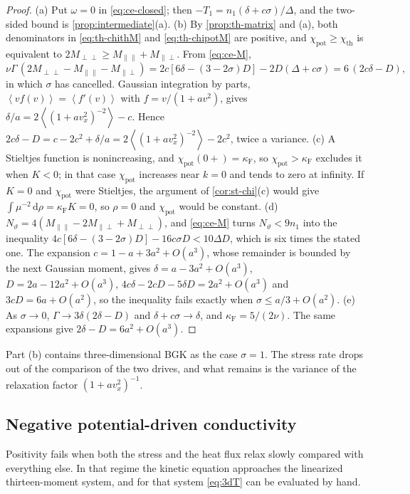 \documentclass[11pt]{article}
\newcommand{\dd}{\,\mathrm d}
\newcommand{\av}[1]{\left\langle #1\right\rangle}
\newcommand{\F}{\kappa_{\mathrm F}}
\newcommand{\thr}{\mathrm{th}}
\newcommand{\pot}{\mathrm{pot}}
\theoremstyle{definition}
\theoremstyle{remark}
\numberwithin{equation}{section}
\begin{document}
\begin{proof}
(a) Put $\omega=0$ in \eqref{eq:ce-closed}; then
$-T_1=n_1(\delta+c\sigma)/\Delta$, and the two-sided bound is
\cref{prop:intermediate}(a).
(b) By \cref{prop:th-matrix} and (a), both denominators in
\eqref{eq:th-chithM} and \eqref{eq:th-chipotM} are positive, and
$\chi_\pot\geq\chi_\thr$ is equivalent to
$2M_{\perp\perp}\geq M_{\parallel\parallel}+M_{\parallel\perp}$. From
\eqref{eq:ce-M},
\[
 \nu\Gamma\,(2M_{\perp\perp}-M_{\parallel\parallel}-M_{\parallel\perp})
 =2c[6\delta-(3-2\sigma)D]-2D(\Delta+c\sigma)=6\,(2c\delta-D),
\]
in which $\sigma$ has cancelled. Gaussian integration by parts,
$\av{vf(v)}=\av{f'(v)}$ with $f=v/(1+av^2)$, gives
$\delta/a=2\av{(1+av_x^2)^{-2}}-c$. Hence
$2c\delta-D=c-2c^2+\delta/a=2\av{(1+av_x^2)^{-2}}-2c^2$, twice a
variance.
(c) A Stieltjes function is nonincreasing, and $\chi_\pot(0+)=\F$, so
$\chi_\pot>\F$ excludes it when $K<0$; in that case
$\chi_\pot$ increases near $k=0$ and tends to zero at infinity. If $K=0$
and $\chi_\pot$ were Stieltjes, the argument of \cref{cor:st-chi}(c)
would give $\int\mu^{-2}\dd\rho=\F K=0$, so $\rho=0$ and $\chi_\pot$
would be constant.
(d) $N_\vartheta=4(M_{\parallel\parallel}-2M_{\parallel\perp}
+M_{\perp\perp})$, and \eqref{eq:ce-M} turns $N_\vartheta<9n_1$ into the
inequality $4c[6\delta-(3-2\sigma)D]-16c\sigma D<10\Delta D$, which is
six times the stated one. The expansion
$c=1-a+3a^2+O(a^3)$, whose remainder is bounded by the next Gaussian
moment, gives $\delta=a-3a^2+O(a^3)$, $D=2a-12a^2+O(a^3)$,
$4c\delta-2cD-5\delta D=2a^2+O(a^3)$ and $3cD=6a+O(a^2)$, so the
inequality fails exactly when $\sigma\leq a/3+O(a^2)$.
(e) As $\sigma\to0$, $\Gamma\to3\delta(2\delta-D)$ and
$\delta+c\sigma\to\delta$, and $\F=5/(2\nu)$. The same expansions give
$2\delta-D=6a^2+O(a^3)$.
\end{proof}

Part (b) contains three-dimensional BGK as the case $\sigma=1$.
The stress rate drops out of the comparison of the two drives, and what
remains is the variance of the relaxation factor $(1+av_x^2)^{-1}$.

\subsection{Negative potential-driven conductivity}\label{sec:ce-negative}

Positivity fails when both the stress and the heat flux relax slowly
compared with everything else. In that regime the kinetic equation
approaches the linearized thirteen-moment system, and for that system
\eqref{eq:3dT} can be evaluated by hand.
\end{document}
